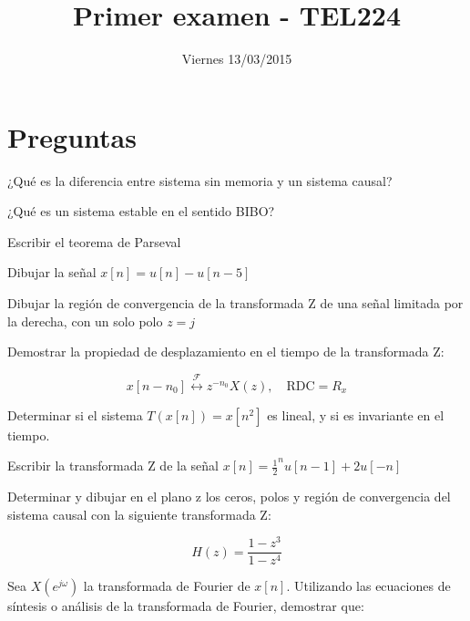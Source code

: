 \documentclass[addpoints]{exam}
\begin{document}
\headrule


\title{Primer examen - TEL224}
\date{Viernes 13/03/2015}
\maketitle

\vspace{0.1in}

\section*{Preguntas}

\begin{questions}
\question[5]
¿Qué es la diferencia entre sistema sin memoria y un sistema causal?

\question[5]
¿Qué es un sistema estable en el sentido BIBO?

\question[5]
Escribir el teorema de Parseval

\newpage

\question[5]
Dibujar la señal \(x[n] = u[n] - u[n-5]\)

\question[5]
Dibujar la región de convergencia de la transformada Z de una señal limitada por la derecha, con un solo polo \(z=j\)

\question[5]
Demostrar la propiedad de desplazamiento en el tiempo de la transformada Z:

$$x[n-n_0] \overset{\mathscr{F}}{\longleftrightarrow} z^{-n_0} X(z), \quad \text{RDC}=R_x$$

\newpage

\question[5]
Determinar si el sistema \(T\left(x[n]\right) = x[n^2]\) es lineal, y si es invariante en el tiempo.

\question[5]
Escribir la transformada Z de la señal \(x[n] = \frac{1}{2}^n u[n-1] + 2 u[-n]\)

\question[10]
Determinar y dibujar en el plano z los ceros, polos y región de convergencia del sistema causal con la siguiente transformada Z:

$$H(z) = \frac{1-z^3}{1-z^4}$$

\newpage

\question[10]
Sea \(X\left(e^{j\omega}\right)\) la transformada de Fourier de \(x[n]\). Utilizando las ecuaciones de síntesis o análisis de la transformada de Fourier, demostrar que:


\end{questions}
\end{document}
